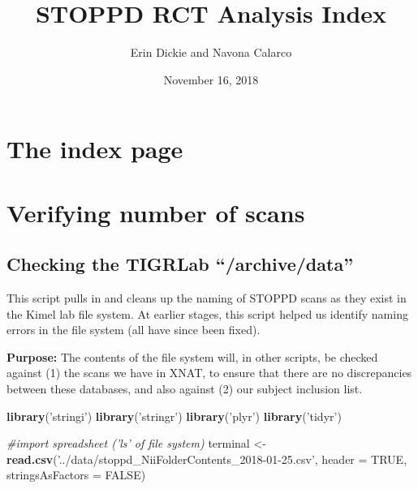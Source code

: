\documentclass[]{article}
\title{STOPPD RCT Analysis Index}
\author{Erin Dickie and Navona Calarco}
\date{November 16, 2018}
\newenvironment{Shaded}{\begin{snugshade}}{\end{snugshade}}
\newcommand{\KeywordTok}[1]{\textcolor[rgb]{0.13,0.29,0.53}{\textbf{#1}}}
\newcommand{\DataTypeTok}[1]{\textcolor[rgb]{0.13,0.29,0.53}{#1}}
\newcommand{\StringTok}[1]{\textcolor[rgb]{0.31,0.60,0.02}{#1}}
\newcommand{\CommentTok}[1]{\textcolor[rgb]{0.56,0.35,0.01}{\textit{#1}}}
\newcommand{\OtherTok}[1]{\textcolor[rgb]{0.56,0.35,0.01}{#1}}
\newcommand{\NormalTok}[1]{#1}
\theoremstyle{definition}
\theoremstyle{definition}
\theoremstyle{definition}
\theoremstyle{remark}
\begin{document}
\maketitle

{
\setcounter{tocdepth}{2}
\tableofcontents
}
\section{The index page}\label{the-index-page}

\section{Verifying number of scans}\label{verifying-number-of-scans}

\subsection{\texorpdfstring{Checking the TIGRLab
``/archive/data''}{Checking the TIGRLab /archive/data}}\label{checking-the-tigrlab-archivedata}

This script pulls in and cleans up the naming of STOPPD scans as they
exist in the Kimel lab file system. At earlier stages, this script
helped us identify naming errors in the file system (all have since been
fixed).

\textbf{Purpose:} The contents of the file system will, in other
scripts, be checked against (1) the scans we have in XNAT, to ensure
that there are no discrepancies between these databases, and also
against (2) our subject inclusion list.

\begin{Shaded}
\begin{Highlighting}[]
\KeywordTok{library}\NormalTok{(}\StringTok{'stringi'}\NormalTok{)}
\KeywordTok{library}\NormalTok{(}\StringTok{'stringr'}\NormalTok{)}
\KeywordTok{library}\NormalTok{(}\StringTok{'plyr'}\NormalTok{)}
\KeywordTok{library}\NormalTok{(}\StringTok{'tidyr'}\NormalTok{)}
\end{Highlighting}
\end{Shaded}

\begin{Shaded}
\begin{Highlighting}[]
\CommentTok{#import spreadsheet ('ls' of file system)}
\NormalTok{terminal <-}\StringTok{ }\KeywordTok{read.csv}\NormalTok{(}\StringTok{'../data/stoppd_NiiFolderContents_2018-01-25.csv'}\NormalTok{, }\DataTypeTok{header =} \OtherTok{TRUE}\NormalTok{, }\DataTypeTok{stringsAsFactors =} \OtherTok{FALSE}\NormalTok{)}
\end{Highlighting}
\end{Shaded}
\end{document}
